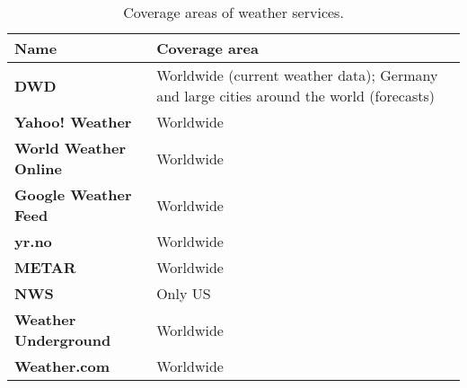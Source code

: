 \begin{table}
\centering
\begin{tabular}{|p{}|p{}|}
  \hline
  \textbf{Name} & \textbf{Coverage area} \\
  \hline\hline
  \textbf{DWD} & Worldwide (current weather data); Germany and large cities around the world (forecasts) \\
  \hline
  \textbf{Yahoo! Weather} & Worldwide \\
  \hline
  \textbf{World Weather Online} & Worldwide \\
  \hline
  \textbf{Google Weather Feed} & Worldwide \\
  \hline
  \textbf{yr.no} & Worldwide \\
  \hline
  \textbf{\acs{METAR}} & Worldwide \\
  \hline
  \textbf{\acs{NWS}} & Only US \\
  \hline
  \textbf{Weather Underground} & Worldwide \\
  \hline
  \textbf{Weather.com} & Worldwide \\
  \hline
\end{tabular}
\vspace{.5em}
\caption{Coverage areas of weather services.}
\label{table:weather_data2}
\end{table}


